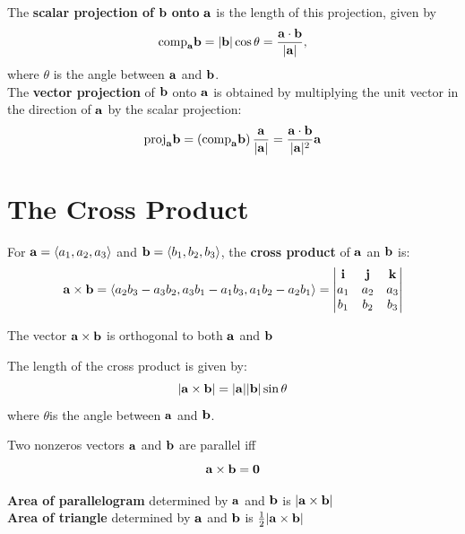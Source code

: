 \documentclass{report}
\begin{document}
The \textbf{scalar projection of} $\mathbf{b}$ \textbf{onto} $\mathbf{a}$ is the length of this 
projection, given by
\[
\text{comp}_{\mathbf{a}} \mathbf{b} = |\mathbf{b}|\cos\theta = \frac{\mathbf{a} \cdot \mathbf{b}}{|\mathbf{a}|},
\]
where $\theta$ is the angle between $\mathbf{a}$ and $\mathbf{b}$.
\\

The \textbf{vector projection} of $\mathbf{b}$ onto $\mathbf{a}$ is obtained by multiplying the 
unit vector in the direction of $\mathbf{a}$ by the scalar projection:
\[
\text{proj}_{\mathbf{a}} \mathbf{b} = \left(\text{comp}_{\mathbf{a}} \mathbf{b} \right)\frac{\mathbf{a}}{|\mathbf{a}|} 
= \frac{\mathbf{a} \cdot \mathbf{b}}{|\mathbf{a}|^2}\mathbf{a}
\]

\section{The Cross Product}

\begin{definition}
For $\mathbf{a} = \langle a_1, a_2, a_3 \rangle$ and $\mathbf{b} = \langle b_1, b_2, b_3 \rangle$, the \textbf{cross product}
of $\mathbf{a}$ an $\mathbf{b}$ is:
\[\mathbf{a} \times \mathbf{b} = \langle a_2 b_3 - a_3 b_2, a_3 b_1 - a_1 b_3, a_1 b_2 - a_2 b_1 \rangle = \begin{vmatrix}
\mathbf{i} & \mathbf{j} & \mathbf{k} \\
a_1 & a_2 & a_3 \\
b_1 & b_2 & b_3
\end{vmatrix}
\]
\end{definition}

\begin{theorem}
    The vector $\mathbf{a} \times \mathbf{b}$ is orthogonal to both $\mathbf{a}$ and $\mathbf{b}$
\end{theorem}

\begin{theorem}
    The length of the cross product is given by: 
    \[ |\mathbf{a} \times \mathbf{b}| = |\mathbf{a}| |\mathbf{b}| \sin \theta\]
    where $\theta$is the angle between $\mathbf{a}$ and $\mathbf{b}$.
\end{theorem}

\begin{corollary}
    Two nonzeros vectors $\mathbf{a}$ and $\mathbf{b}$ are parallel iff 
    \[\mathbf{a} \times \mathbf{b} = \mathbf{0}\]
\end{corollary}

\textbf{Area of parallelogram} determined by $\mathbf{a}$ and $\mathbf{b}$ is $|\mathbf{a} \times \mathbf{b}|$
\\

\textbf{Area of triangle} determined by $\mathbf{a}$ and $\mathbf{b}$ is $\frac{1}{2}|\mathbf{a} \times \mathbf{b}|$
\\
\end{document}

